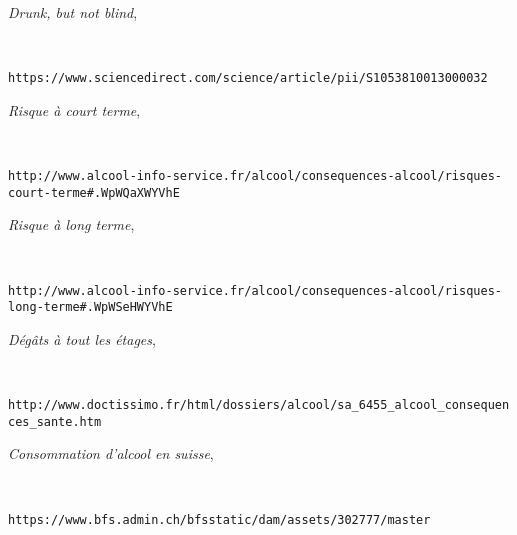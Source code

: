 \documentclass[a4paper, 14pt]{extarticle}
\begin{document}
	\begin{thebibliography}{9}
		 \emph{Drunk, but not blind}, \begin{scriptsize}\end{scriptsize}\\
    \begin{scriptsize}\texttt{https://www.sciencedirect.com/science/article/pii/S1053810013000032 }\end{scriptsize}

     \emph{Risque à court terme}, \begin{scriptsize}[article]\end{scriptsize}\\
    \begin{scriptsize}\texttt{http://www.alcool-info-service.fr/alcool/consequences-alcool/risques-court-terme\#.WpWQaXWYVhE} \end{scriptsize}

     \emph{Risque à long terme}, \begin{scriptsize}[article]\end{scriptsize}\\
    \begin{scriptsize}\texttt{http://www.alcool-info-service.fr/alcool/consequences-alcool/risques-long-terme\#.WpWSeHWYVhE} \end{scriptsize}

     \emph{Dégâts à tout les étages}, \begin{scriptsize}[article]\end{scriptsize}\\
    \begin{scriptsize}\texttt{http://www.doctissimo.fr/html/dossiers/alcool/sa\_6455\_alcool\_consequences\_sante.htm} \end{scriptsize}

     \emph{Consommation d'alcool en suisse}, \begin{scriptsize}[xls]\end{scriptsize}\\
    \begin{scriptsize}\texttt{https://www.bfs.admin.ch/bfsstatic/dam/assets/302777/master} \end{scriptsize}

	\end{thebibliography}
\end{document}
